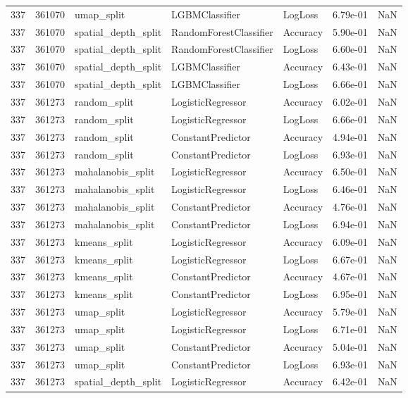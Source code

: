 \begin{tabular}{rrlllrr}
337 & 361070 & umap\_split & LGBMClassifier & LogLoss & 6.79e-01 & NaN \\
337 & 361070 & spatial\_depth\_split & RandomForestClassifier & Accuracy & 5.90e-01 & NaN \\
337 & 361070 & spatial\_depth\_split & RandomForestClassifier & LogLoss & 6.60e-01 & NaN \\
337 & 361070 & spatial\_depth\_split & LGBMClassifier & Accuracy & 6.43e-01 & NaN \\
337 & 361070 & spatial\_depth\_split & LGBMClassifier & LogLoss & 6.66e-01 & NaN \\
337 & 361273 & random\_split & LogisticRegressor & Accuracy & 6.02e-01 & NaN \\
337 & 361273 & random\_split & LogisticRegressor & LogLoss & 6.66e-01 & NaN \\
337 & 361273 & random\_split & ConstantPredictor & Accuracy & 4.94e-01 & NaN \\
337 & 361273 & random\_split & ConstantPredictor & LogLoss & 6.93e-01 & NaN \\
337 & 361273 & mahalanobis\_split & LogisticRegressor & Accuracy & 6.50e-01 & NaN \\
337 & 361273 & mahalanobis\_split & LogisticRegressor & LogLoss & 6.46e-01 & NaN \\
337 & 361273 & mahalanobis\_split & ConstantPredictor & Accuracy & 4.76e-01 & NaN \\
337 & 361273 & mahalanobis\_split & ConstantPredictor & LogLoss & 6.94e-01 & NaN \\
337 & 361273 & kmeans\_split & LogisticRegressor & Accuracy & 6.09e-01 & NaN \\
337 & 361273 & kmeans\_split & LogisticRegressor & LogLoss & 6.67e-01 & NaN \\
337 & 361273 & kmeans\_split & ConstantPredictor & Accuracy & 4.67e-01 & NaN \\
337 & 361273 & kmeans\_split & ConstantPredictor & LogLoss & 6.95e-01 & NaN \\
337 & 361273 & umap\_split & LogisticRegressor & Accuracy & 5.79e-01 & NaN \\
337 & 361273 & umap\_split & LogisticRegressor & LogLoss & 6.71e-01 & NaN \\
337 & 361273 & umap\_split & ConstantPredictor & Accuracy & 5.04e-01 & NaN \\
337 & 361273 & umap\_split & ConstantPredictor & LogLoss & 6.93e-01 & NaN \\
337 & 361273 & spatial\_depth\_split & LogisticRegressor & Accuracy & 6.42e-01 & NaN \\

\end{tabular}
